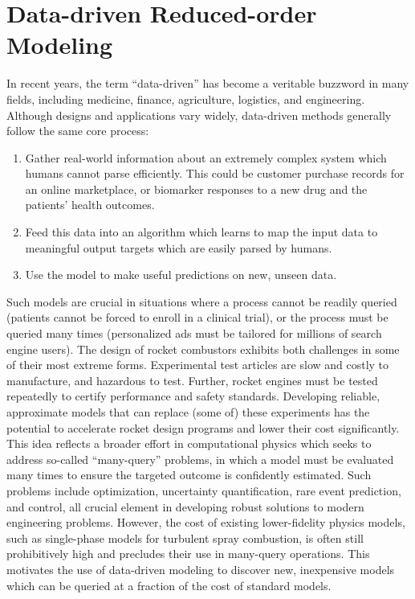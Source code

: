 \section{Data-driven Reduced-order Modeling}

In recent years, the term ``data-driven'' has become a veritable buzzword in many fields, including medicine, finance, agriculture, logistics, and engineering. Although designs and applications vary widely, data-driven methods generally follow the same core process:

\begin{enumerate}
    \item Gather real-world information about an extremely complex system which humans cannot parse efficiently. This could be customer purchase records for an online marketplace, or biomarker responses to a new drug and the patients' health outcomes.
    \item Feed this data into an algorithm which learns to map the input data to meaningful output targets which are easily parsed by humans.
    \item Use the model to make useful predictions on new, unseen data.
\end{enumerate}

Such models are crucial in situations where a process cannot be readily queried (patients cannot be forced to enroll in a clinical trial), or the process must be queried many times (personalized ads must be tailored for millions of search engine users). The design of rocket combustors exhibits both challenges in some of their most extreme forms. Experimental test articles are slow and costly to manufacture, and hazardous to test. Further, rocket engines must be tested repeatedly to certify performance and safety standards. Developing reliable, approximate models that can replace (some of) these experiments has the potential to accelerate rocket design programs and lower their cost significantly. This idea reflects a broader effort in computational physics which seeks to address so-called ``many-query'' problems, in which a model must be evaluated many times to ensure the targeted outcome is confidently estimated. Such problems include optimization, uncertainty quantification, rare event prediction, and control, all crucial element in developing robust solutions to modern engineering problems. However, the cost of existing lower-fidelity physics models, such as single-phase models for turbulent spray combustion, is often still prohibitively high and precludes their use in many-query operations. This motivates the use of data-driven modeling to discover new, inexpensive models which can be queried at a fraction of the cost of standard models.

